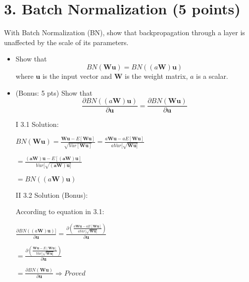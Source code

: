\documentclass[12pt]{article}%
\begin{document}
\section*{3. Batch Normalization (5 points)}
With Batch Normalization (BN), show that backpropagation through a layer is unaffected by the scale of its parameters. 
\begin{itemize}
	\item Show that \[BN(\mathbf{Wu})=BN((a\mathbf{W})\mathbf{u})\] where $\mathbf{u}$ is the input vector and $\mathbf{W}$ is the weight matrix, $a$ is a scalar. 
	\item (Bonus: 5 pts) Show that 
	\[\frac{\partial BN((a\mathbf{W})\mathbf{u})}{\partial \mathbf{u}}=\frac{\partial BN(\mathbf{W}\mathbf{u})}{\partial \mathbf{u}}\]
\end{itemize}

\begin{itemize}
\item[I] 3.1 Solution:

$BN(\mathbf{Wu}) = \frac{\mathbf{Wu}-E[\mathbf{Wu}]}{\sqrt{Var[\mathbf{Wu}]}} = \frac{a\mathbf{Wu}-aE[\mathbf{Wu}]}{aVar[\sqrt{\mathbf{Wu}]}}
$ 

$=\frac{\mathbf{(aW)u}-E[\mathbf{(aW)u}]}{Var[\sqrt{\mathbf{(aW)u}]}}$ 

$= BN((a\mathbf{W})\mathbf{u}) $

\item[II] 3.2 Solution (Bonus):

According to equation in 3.1:

$\frac{\partial BN((a\mathbf{W})\mathbf{u})]}{\partial \mathbf{u}}=  \frac{\partial (\frac{a\mathbf{Wu}-aE[\mathbf{Wu}]}{aVar[\sqrt{\mathbf{Wu}]}}) }{\partial \mathbf{u}} $

$= \frac{\partial (\frac{\mathbf{Wu}-E[\mathbf{Wu}]}{Var[\sqrt{\mathbf{Wu}]}}) }{\partial \mathbf{u}}$

$ = \frac{\partial BN(\mathbf{Wu})}{\partial \mathbf{u}}   \Longrightarrow Proved$


\end{itemize}



\newpage
\end{document}
